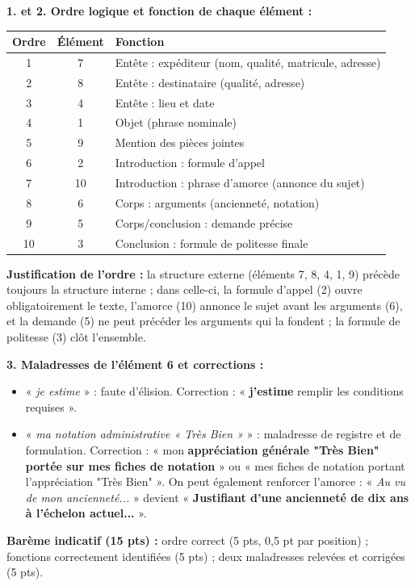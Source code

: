 \documentclass[11pt]{article}
\begin{document}
\begin{corrige}
\textbf{1. et 2. Ordre logique et fonction de chaque élément :}
\begin{center}
\begin{tabularx}{\linewidth}{|c|c|X|}\hline
\rowcolor{popblueL} \textbf{Ordre} & \textbf{Élément} & \textbf{Fonction} \\ \hline
1 & 7 & Entête : expéditeur (nom, qualité, matricule, adresse) \\ \hline
2 & 8 & Entête : destinataire (qualité, adresse) \\ \hline
3 & 4 & Entête : lieu et date \\ \hline
4 & 1 & Objet (phrase nominale) \\ \hline
5 & 9 & Mention des pièces jointes \\ \hline
6 & 2 & Introduction : formule d'appel \\ \hline
7 & 10 & Introduction : phrase d'amorce (annonce du sujet) \\ \hline
8 & 6 & Corps : arguments (ancienneté, notation) \\ \hline
9 & 5 & Corps/conclusion : demande précise \\ \hline
10 & 3 & Conclusion : formule de politesse finale \\ \hline
\end{tabularx}
\end{center}
\textbf{Justification de l'ordre :} la structure externe (éléments 7, 8, 4, 1, 9) précède toujours la structure interne ; dans celle-ci, la formule d'appel (2) ouvre obligatoirement le texte, l'amorce (10) annonce le sujet avant les arguments (6), et la demande (5) ne peut précéder les arguments qui la fondent ; la formule de politesse (3) clôt l'ensemble.
\par\textbf{3. Maladresses de l'élément 6 et corrections :}
\begin{itemize}
    \item « \emph{je estime} » : faute d'élision. Correction : « \textbf{j'estime} remplir les conditions requises ».
    \item « \emph{ma notation administrative « Très Bien »} » : maladresse de registre et de formulation. Correction : « mon \textbf{appréciation générale "Très Bien" portée sur mes fiches de notation} » ou « mes fiches de notation portant l'appréciation "Très Bien" ». On peut également renforcer l'amorce : « \emph{Au vu de mon ancienneté...} » devient « \textbf{Justifiant d'une ancienneté de dix ans à l'échelon actuel...} ».
\end{itemize}
\textbf{Barème indicatif (15 pts) :} ordre correct (5 pts, 0,5 pt par position) ; fonctions correctement identifiées (5 pts) ; deux maladresses relevées et corrigées (5 pts).
\end{corrige}
\end{document}
